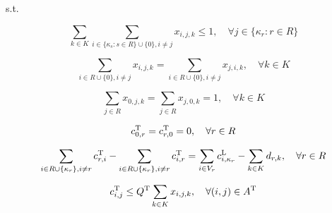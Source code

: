 s.t.

\begin{linenomath}
    \begin{equation}
        \sum_{k \in K}\sum_{i \in \{\kappa_s : s \in R\} \cup \{0\}, i \neq j} x_{i,j,k} \leq 1, \quad \forall j \in \{\kappa_r : r \in R\} \label{eq:regional_visit}
    \end{equation}

\end{linenomath}

\begin{linenomath}
    \begin{equation}
        \sum_{i \in R \cup \{0\}, i \neq j} x_{i,j,k} = \sum_{i \in R \cup \{0\}, i \neq j} x_{j,i,k}, \quad \forall k \in K \label{eq:truck_flow}
    \end{equation}

\end{linenomath}

\begin{linenomath}
    \begin{equation}
        \sum_{j \in R} x_{0,j,k} = \sum_{j \in R} x_{j,0,k} = 1, \quad \forall k \in K \label{eq:depot_flow}
    \end{equation}

\end{linenomath}

\begin{linenomath}
    \begin{equation}
        c_{0,r}^{\text{T}} = c_{r,0}^{\text{T}} = 0, \quad \forall r \in R \label{eq:depot_inventory}
    \end{equation}
\end{linenomath}

\begin{linenomath}
    \begin{equation}
        \sum_{i \in R \cup \{\kappa_r\}, i \neq r} c_{r,i}^{\text{T}} - \sum_{i \in R \cup \{\kappa_r\}, i \neq r} c_{i,r}^{\text{T}} = \sum_{i \in V_r} c_{i,\kappa_r}^{\text{L}} - \sum_{k \in K} d_{r,k}, \quad \forall r \in R \label{eq:truck_inventory}
    \end{equation}
\end{linenomath}

\begin{linenomath}
    \begin{equation}
        c_{i,j}^{\text{T}} \leq Q^{\text{T}} \sum_{k \in K} x_{i,j,k}, \quad \forall (i,j) \in A^{\text{T}} \label{eq:truck_capacity}
    \end{equation}
\end{linenomath}

